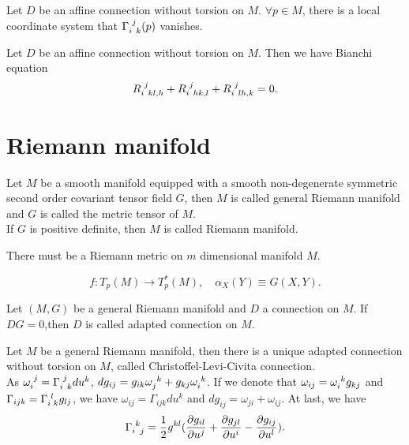 \begin{newthem}
Let $D$ be an affine connection without torsion on $M$. $\forall p \in M$, there is a local coordinate system that $\tensor{\Gamma}{_i^j_k}(p)$ vanishes.
\end{newthem}

\begin{newthem}
Let $D$ be an affine connection without torsion on $M$. Then we have Bianchi equation
\[\tensor{R}{_i^j_{kl,h}} +  \tensor{R}{_i^j_{hk,l}} + \tensor{R}{_i^j_{lh,k}} = 0.\]
\end{newthem}

\section{Riemann manifold}
\begin{newdef} 
Let $M$ be a smooth manifold equipped with a smooth non-degenerate symmetric second order covariant tensor field $G$, then $M$ is called general Riemann manifold and $G$ is called the metric tensor of $M$.\\
If $G$ is positive definite, then $M$ is called Riemann manifold.
\end{newdef}

\vspace{15pt}

\begin{newthem}
There must be a Riemann metric on $m$ dimensional manifold $M$.
\end{newthem}

\vspace{15pt}

\begin{newdef}
\[f:T_p(M) \to T^*_p(M) , \quad \alpha_X(Y) \equiv G(X,Y).\]
\end{newdef}

\vspace{15pt}

\begin{newdef}
Let $(M,G)$ be a general Riemann manifold and $D$ a connection on $M$. If $DG=0$,then $D$ is called adapted connection on $M$.
\end{newdef}

\vspace{15pt}

\begin{newprop} 
Let $M$ be a general Riemann manifold, then there is a unique adapted connection without torsion on $M$, called Christoffel-Levi-Civita connection. \\
As $\tensor{\omega}{_i^j} = \tensor{\Gamma}{_i^j_k} du^k$, $dg_{ij} = g_{ik} \tensor{\omega}{_j^k}   + g_{kj}\tensor{\omega}{_i^k}$.
If we denote that $\omega_{ij} = \tensor{\omega}{_i^k}g_{kj}$ and $\Gamma_{ijk} =\tensor{\Gamma}{_i^l_k} g_{lj}$, we have $\omega_{ij}=\Gamma_{ijk}du^k$ and $dg_{ij} = \omega_{ji}+ \omega_{ij}$.
At last, we have
\[\tensor{\Gamma}{_i^k_j} = \frac{1}{2} g^{kl}(\frac{\partial g_{il}}{\partial u^j} + \frac{\partial g_{jl}}{\partial u^i} - \frac{\partial g_{ij}}{\partial u^l}).\]
\end{newprop}

